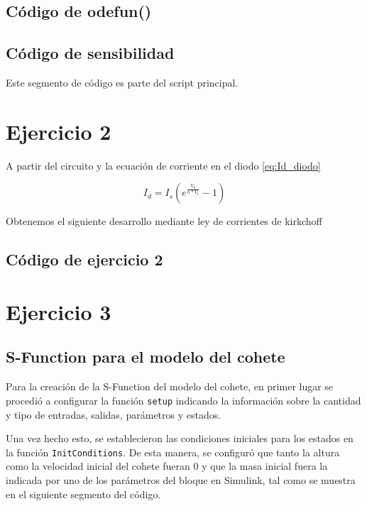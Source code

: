 \documentclass[12pt,letterpaper]{article}
\begin{document}
\subsection{Código de odefun()}


\subsection{Código de sensibilidad}
Este segmento de código es parte del script principal.


\section{Ejercicio 2}
A partir del circuito y la ecuación de corriente en el diodo \ref{eq:Id_diodo}

\begin{equation}
\label{eq:Id_diodo}
I_d=I_s(e^{\frac{V_d}{n*V_t}}-1)
\end{equation}

Obtenemos el siguiente desarrollo mediante ley de corrientes de kirkchoff




\subsection{Código de ejercicio 2}

\section{Ejercicio 3}

\subsection{S-Function para el modelo del cohete}
Para la creación de la S-Function del modelo del cohete, en primer lugar se procedió a configurar la
función \texttt{setup} indicando la información sobre la cantidad y tipo de entradas, salidas,
parámetros y estados.

Una vez hecho esto, se establecieron las condiciones iniciales para los estados en la función
\texttt{InitConditions}. De esta manera, se configuró que tanto la altura como la velocidad inicial
del cohete fueran 0 y que la masa inicial fuera la indicada por uno de los parámetros del bloque en
Simulink, tal como se muestra en el siguiente segmento del código.
\end{document}
